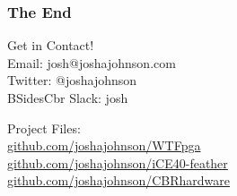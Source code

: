 \documentclass[t]{beamer}
\begin{document}

\begin{frame}
\frametitle{The End}
Get in Contact! \\
Email: josh@joshajohnson.com\\
Twitter:  @\textunderscore joshajohnson\\
BSidesCbr Slack: josh\\
\vspace{6mm}

Project Files: \\
\url{github.com/joshajohnson/WTFpga}\\
\url{github.com/joshajohnson/iCE40-feather}\\
\url{github.com/joshajohnson/CBRhardware}\\

\end{frame}
\end{document}
